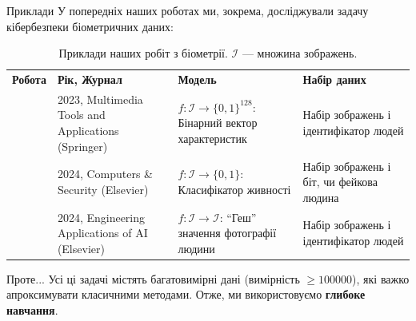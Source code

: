 \documentclass{zkdl-presentation-template}
\begin{document}
    \begin{frame}{Приклади}
        У попередніх наших роботах
        \cite{our-biometrics-1,our-biometrics-2,our-biometrics-3} ми, зокрема,
        досліджували задачу кібербезпеки біометричних даних:

        \begin{table}
            \scriptsize
            \centering
            \begin{tabularx}{\textwidth}{|c|X|X|X|}
                \hline
                \cellcolor{gray!20}\textbf{Робота} & \cellcolor{gray!20}\textbf{Рік, Журнал} & \cellcolor{gray!20}\textbf{Модель} & \cellcolor{gray!20}\textbf{Набір даних} \\
                \cite{our-biometrics-1} & 2023, Multimedia Tools and Applications (Springer) & $f: \mathcal{I} \to \{0,1\}^{128}$: Бінарний вектор характеристик & Набір зображень і ідентифікатор людей \\
                \cite{our-biometrics-2} & 2024, Computers \& Security (Elsevier) & $f: \mathcal{I} \to \{0,1\}$: Класифікатор живності & Набір зображень і біт, чи фейкова людина \\
                \cite{our-biometrics-3} & 2024, Engineering Applications of AI (Elsevier) & $f: \mathcal{I} \to \mathcal{I}$: ``Геш'' значення фотографії людини & Набір зображень і ідентифікатор людей \\
                \hline
            \end{tabularx}
            \caption{Приклади наших робіт з біометрії. $\mathcal{I}$ --- множина зображень.}
        \end{table}

        \begin{alertblock}{Проте...}
            Усі ці задачі містять багатовимірні дані (вимірність $\geq 100000$), які важко апроксимувати
            класичними методами. Отже, ми використовуємо \textbf{глибоке навчання}.
        \end{alertblock}
    \end{frame}
\end{document}
